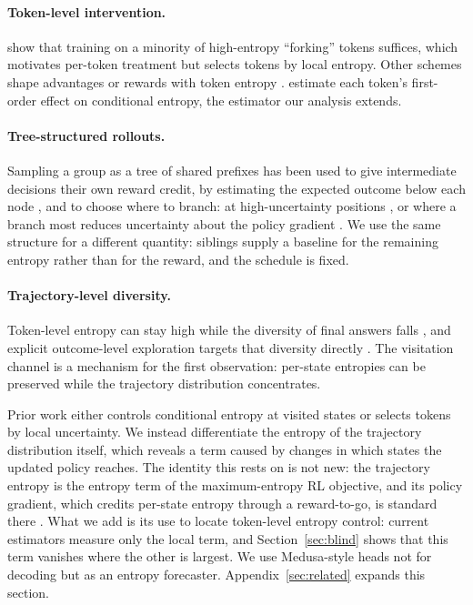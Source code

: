 \documentclass[11pt]{article}
\begin{document}
\paragraph{Token-level intervention.} \citet{wang2025dbeyond} show that training on a
minority of high-entropy ``forking'' tokens suffices, which motivates per-token
treatment but selects tokens by local entropy. Other schemes shape advantages or
rewards with token entropy \citep{cheng2025reasoning,tan2025gtpo,zhang2025dedge}.
\citet{steer} estimate each token's first-order effect on conditional entropy, the
estimator our analysis extends.

\paragraph{Tree-structured rollouts.} Sampling a group as a tree of shared prefixes has
been used to give intermediate decisions their own reward credit, by estimating the
expected outcome below each node \citep{hou2025treerl,yang2025treerpo,cao2026treeadv},
and to choose where to branch: at high-uncertainty positions
\citep{hou2025treerl,cao2026treeadv}, or where a branch most reduces uncertainty
about the policy gradient \citep{khomich2026epig}. We use the same structure for a
different quantity: siblings supply a baseline for the remaining entropy rather than
for the reward, and the schedule is fixed.

\paragraph{Trajectory-level diversity.} Token-level entropy can stay high while the
diversity of final answers falls \citep{wu2025ainvisible}, and explicit outcome-level
exploration targets that diversity directly \citep{song2025outcome}. The visitation
channel is a mechanism for the first observation: per-state entropies can be
preserved while the trajectory distribution concentrates.

Prior work either controls conditional entropy at visited states or selects tokens by
local uncertainty. We instead differentiate the entropy of the trajectory distribution
itself, which reveals a term caused by changes in which states the updated policy
reaches. The identity this rests on is not new: the trajectory entropy is the entropy
term of the maximum-entropy RL objective, and its policy gradient, which credits
per-state entropy through a reward-to-go, is standard there
\citep{schulman2017equivalence,levine2018reinforcement}. What we add is its use to
locate token-level entropy control: current estimators measure only the local term,
and Section~\ref{sec:blind} shows that this term vanishes where the other is largest.
We use Medusa-style heads \citep{medusa} not for decoding but as an entropy
forecaster. Appendix~\ref{sec:related} expands this section.
\end{document}
